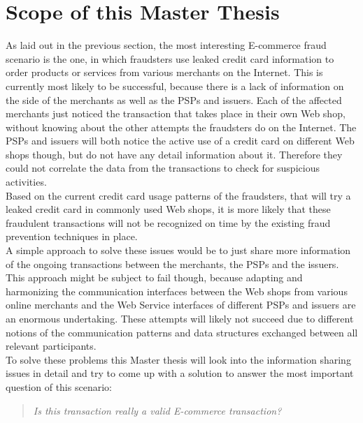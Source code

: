 
\section{Scope of this Master Thesis}
\label{sec:scope_thesis}

As laid out in the previous section, the most interesting \gls{E-commerce} fraud scenario is the one, in which fraudsters use leaked credit card information to order products or services from various merchants on the Internet. This is currently most likely to be successful, because there is a lack of information on the side of the merchants as well as the \gls{PSP}s and issuers. Each of the affected merchants just noticed the transaction that takes place in their own Web shop, without knowing about the other attempts the fraudsters do on the Internet. The \gls{PSP}s and issuers will both notice the active use of a credit card on different Web shops though, but do not have any detail information about it. Therefore they could not correlate the data from the transactions to check for suspicious activities. \\

Based on the current credit card usage patterns of the fraudsters, that will try a leaked credit card in commonly used Web shops, it is more likely that these fraudulent transactions will not be recognized on time by the existing fraud prevention techniques in place. \\

A simple approach to solve these issues would be to just share more information of the ongoing transactions between the merchants, the \gls{PSP}s and the issuers. This approach might be subject to fail though, because adapting and harmonizing the communication interfaces between the Web shops from various online merchants and the Web Service interfaces of different \gls{PSP}s and issuers are an enormous undertaking. These attempts will likely not succeed due to different notions of the communication patterns and data structures exchanged between all relevant participants. \\

To solve these problems this Master thesis will look into the information sharing issues in detail and try to come up with a solution to answer the most important question of this scenario: \@

\begin{quotation}
  \textit{Is this transaction really a valid \gls{E-commerce} transaction?}
\end{quotation}

